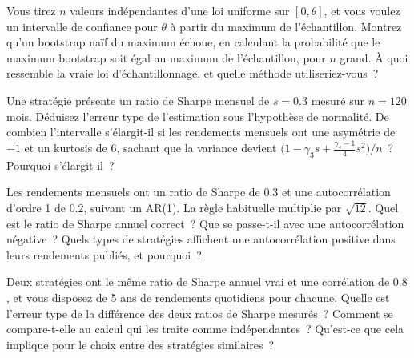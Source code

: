 \begin{question}\label{iq:iv1:statistics:30}
Vous tirez $n$ valeurs indépendantes d'une loi uniforme sur $[0, \theta]$, et vous voulez un intervalle de confiance pour $\theta$ à partir du maximum de l'échantillon. Montrez qu'un bootstrap naïf du maximum échoue, en calculant la probabilité que le maximum bootstrap soit égal au maximum de l'échantillon, pour $n$ grand. À quoi ressemble la vraie loi d'échantillonnage, et quelle méthode utiliseriez-vous~?
\end{question}

\begin{question}\label{iq:iv1:statistics:31}
Une stratégie présente un ratio de Sharpe mensuel de $s = 0.3$ mesuré sur $n = 120$ mois. Déduisez l'erreur type de l'estimation sous l'hypothèse de normalité. De combien l'intervalle s'élargit-il si les rendements mensuels ont une asymétrie de $-1$ et un kurtosis de 6, sachant que la variance devient $\bigl(1 - \gamma_3 s + \frac{\gamma_4 - 1}{4}s^2\bigr)/n$~? Pourquoi s'élargit-il~?
\end{question}

\begin{question}\label{iq:iv1:statistics:32}
Les rendements mensuels ont un ratio de Sharpe de $0.3$ et une autocorrélation d'ordre 1 de $0.2$, suivant un AR(1). La règle habituelle multiplie par $\sqrt{12}$. Quel est le ratio de Sharpe annuel correct~? Que se passe-t-il avec une autocorrélation négative~? Quels types de stratégies affichent une autocorrélation positive dans leurs rendements publiés, et pourquoi~?
\end{question}

\begin{question}\label{iq:iv1:statistics:33}
Deux stratégies ont le même ratio de Sharpe annuel vrai et une corrélation de $0.8$, et vous disposez de 5 ans de rendements quotidiens pour chacune. Quelle est l'erreur type de la différence des deux ratios de Sharpe mesurés~? Comment se compare-t-elle au calcul qui les traite comme indépendantes~? Qu'est-ce que cela implique pour le choix entre des stratégies similaires~?
\end{question}

